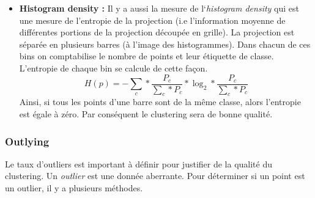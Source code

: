 \begin{itemize}
\item
\textbf{Histogram density : }
\smallskip
Il y a aussi la mesure de l`\textit{histogram density} \cite{HeulotThese} \cite{AndradaTatu2009combining} qui est une mesure de l’entropie de la projection
(i.e l'information moyenne de différentes portions de la projection découpée en grille). La
projection est séparée en plusieurs barres (à l'image des histogrammes). Dans chacun de
ces bins on comptabilise le nombre de points et leur étiquette de classe. L’entropie de
chaque bin se calcule de cette façon. \[ H(p) = - \sum_{c} * \frac{P_c}{\sum_{c}*P_c} * \log_2 * \frac{P_c}{\sum_c * P_c} \]
Ainsi, si tous les points d’une barre sont de la même classe, alors l’entropie est égale à zéro. Par conséquent le clustering sera de bonne qualité.

\end{itemize}
\smallskip



\subsubsection{Outlying}

Le taux d’outliers est important à définir pour justifier de la qualité du clustering.
Un \textit{outlier} est une donnée aberrante. Pour déterminer si un point est un outlier, il y a plusieurs méthodes.

